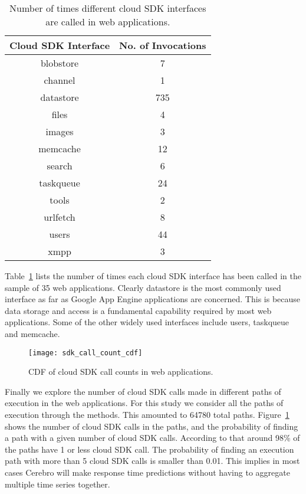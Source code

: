 \begin{table}[htdp]
\caption{Number of times different cloud SDK interfaces are called in web applications.}
\begin{center}
\begin{tabular}{|c|c|}
\hline
Cloud SDK Interface & No. of Invocations \\ \hline
blobstore & 7 \\ \hline
channel & 1 \\ \hline
datastore & 735 \\ \hline
files & 4 \\ \hline
images & 3 \\ \hline
memcache & 12 \\ \hline
search & 6 \\ \hline
taskqueue & 24 \\ \hline
tools & 2 \\ \hline
urlfetch & 8 \\ \hline
users & 44 \\ \hline
xmpp & 3 \\ \hline
\end{tabular}
\end{center}
\label{tab:sdk_call_counts}
\end{table}

Table~\ref{tab:sdk_call_counts} lists the number of times each cloud SDK interface has been called in the sample of
35 web applications. Clearly datastore is the most commonly used interface as far as Google App Engine applications are 
concerned. This is because data storage and access is a fundamental capability required by most web applications. 
Some of the other widely used interfaces include users, taskqueue and memcache. 

\begin{figure}
\centering
\texttt{[image: sdk\_call\_count\_cdf]}
\caption{CDF of cloud SDK call counts in web applications.}
\label{fig:sdk_call_count_cdf}
\end{figure}

Finally we explore the number of cloud SDK calls made in different paths of execution in the web applications. For this study
we consider all the paths of execution through the methods. This amounted to 64780 total paths. Figure~\ref{fig:sdk_call_count_cdf}
shows the number of cloud SDK calls in the paths, and the probability of finding a path with a given number of cloud SDK calls.
According to that around 98\% of the paths have 1 or less cloud SDK call. The probability of finding an execution path with more than
5 cloud SDK calls is smaller than 0.01. This implies in most cases Cerebro will make response time predictions without having to 
aggregate multiple time series together.